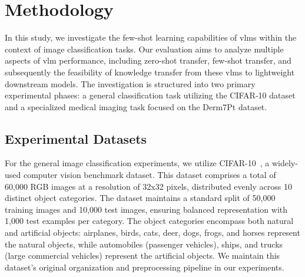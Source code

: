 \documentclass[../ShajiS_RnDReport.tex]{subfiles}
\begin{document}
\section{Methodology}
\label{sec:methodology}
    
In this study, we investigate the few-shot learning capabilities of \glspl{vlm} within the context of image classification tasks. Our evaluation aims to analyze multiple aspects of \gls{vlm} performance, including zero-shot transfer, few-shot transfer, and subsequently the feasibility of knowledge transfer from these \glspl{vlm} to lightweight downstream models. The investigation is structured into two primary experimental phases: a general classification task utilizing the CIFAR-10 dataset and a specialized medical imaging task focused on the Derm7Pt dataset.

\subsection{Experimental Datasets}
For the general image classification experiments, we utilize CIFAR-10~\cite{Krizhevsky2009}, a widely-used computer vision benchmark dataset. This dataset comprises a total of 60,000 RGB images at a resolution of 32x32 pixels, distributed evenly across 10 distinct object categories. The dataset maintains a standard split of 50,000 training images and 10,000 test images, ensuring balanced representation with 1,000 test examples per category. The object categories encompass both natural and artificial objects: airplanes, birds, cats, deer, dogs, frogs, and horses represent the natural objects, while automobiles (passenger vehicles), ships, and trucks (large commercial vehicles) represent the artificial objects. We maintain this dataset's original organization and preprocessing pipeline in our experiments.
\end{document}
